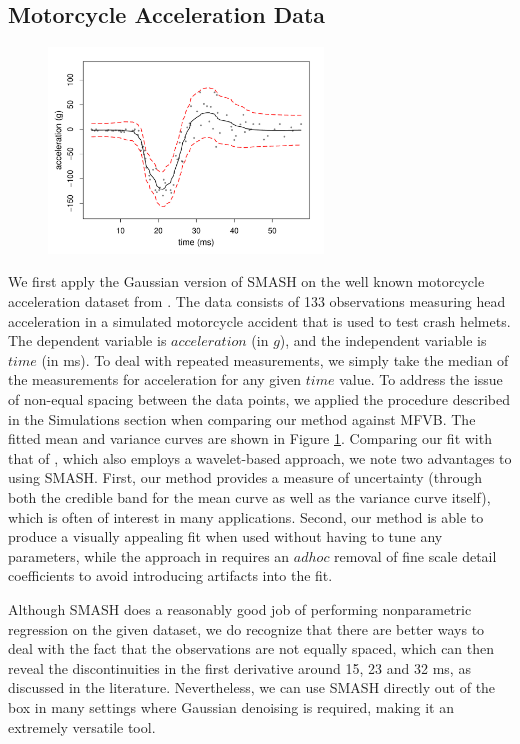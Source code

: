 \documentclass[12pt]{article}
\begin{document}
\subsection{Motorcycle Acceleration Data}
\begin{figure}
\centering
    \includegraphics[width=0.65\textwidth]{motorcycle.pdf}
    \caption{}
    \label{fig:motorcycle}
\end{figure}

We first apply the Gaussian version of SMASH on the well known motorcycle acceleration dataset from \cite{silverman1985some}. The data consists of 133 observations measuring head acceleration in a simulated motorcycle accident that is used to test crash helmets. The dependent variable is $acceleration$ (in $g$), and the independent variable is $time$ (in ms). To deal with repeated measurements, we simply take the median of the measurements for acceleration for any given $time$ value. To address the issue of non-equal spacing between the data points, we applied the procedure described in the Simulations section when comparing our method against MFVB. The fitted mean and variance curves are shown in Figure \ref{fig:motorcycle}. Comparing our fit with that of \cite{Delouille2004Smooth}, which also employs a wavelet-based approach, we note two advantages to using SMASH. First, our method provides a measure of uncertainty (through both the credible band for the mean curve as well as the variance curve itself), which is often of interest in many applications. Second, our method is able to produce a visually appealing fit when used without having to tune any parameters, while the approach in \cite{Delouille2004Smooth} requires an $adhoc$ removal of fine scale detail coefficients to avoid introducing artifacts into the fit.

Although SMASH does a reasonably good job of performing nonparametric regression on the given dataset, we do recognize that there are better ways to deal with the fact that the observations are not equally spaced, which can then reveal the discontinuities in the first derivative around 15, 23 and 32 ms, as discussed in the literature. Nevertheless, we can use SMASH directly out of the box in many settings where Gaussian denoising is required, making it an extremely versatile tool.
\newpage
\end{document}
